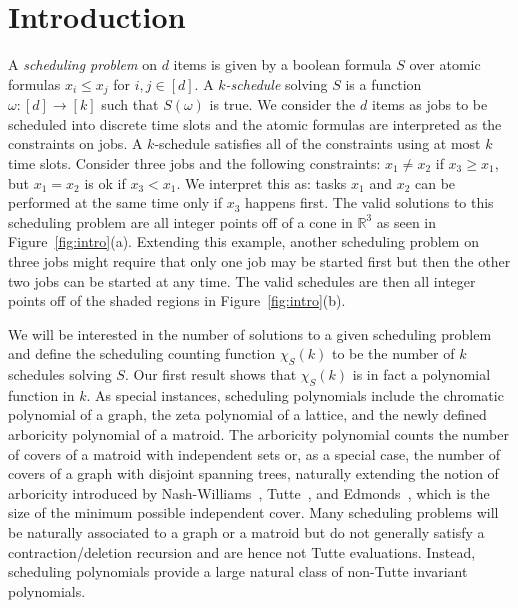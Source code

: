 \documentclass[12pt,reqno]{amsart}
\numberwithin{definition}{section}
\theoremstyle{definition}
\newcommand{\defn}[1]{\emph{#1}}
\newcommand{\poly}{\chi} %
\begin{document}

\section{Introduction}



A \defn{scheduling problem} on $d$ items is given by a boolean
formula $S$ over atomic formulas $x_i\leq x_j$ for
$i,j\in[d]$. A \defn{$k$-schedule} solving $S$ is a function
$\omega:[d]\rightarrow[k]$ such that $S(\omega)$ is true.  We
consider the $d$ items as jobs to be scheduled into discrete time
slots and the atomic formulas are interpreted as the constraints on
jobs.  A $k$-schedule satisfies all of the constraints using at most
$k$ time slots.  Consider three jobs and the following constraints:
$x_1 \neq x_2$ if $ x_3 \geq x_1$, but $x_1 = x_2$ is ok if $x_3 <
x_1$.  We interpret this as: tasks $x_1$ and $x_2$
can be performed at the same time only if $x_3$ happens first.  The valid solutions to this scheduling problem are all integer points off of a cone in $\mathbb{R}^3$ as seen in Figure~\ref{fig:intro}(a).   Extending this example, another scheduling problem on three jobs might require that only one job may be started first but then the other two jobs can be started at any time.  The valid schedules are then all integer points off of the shaded regions in Figure~\ref{fig:intro}(b).

We will be interested in the number of solutions to a given scheduling
problem and define the scheduling counting function $\poly_S(k)$ to be
the number of $k$ schedules solving $S$.  Our first result shows that
$\poly_S(k)$ is in fact a polynomial function in $k$.  As special
instances, scheduling polynomials include the chromatic polynomial of
a graph, the zeta polynomial of a lattice, and the newly defined
arboricity polynomial of a matroid. The arboricity polynomial counts
the number of covers of a matroid with independent sets or, as a
special case, the number of covers of a graph with disjoint spanning
trees, naturally extending the notion of arboricity introduced by
Nash-Williams~\cite{Nash}, Tutte~\cite{Tutte}, and Edmonds~\cite{Edmonds}, which is the size of the minimum
possible independent cover.
 Many scheduling problems will be naturally associated to
a graph or a matroid but do not generally satisfy a
contraction/deletion recursion and are hence not Tutte evaluations.
Instead, scheduling polynomials provide a large natural class of
non-Tutte invariant polynomials.
\end{document}
